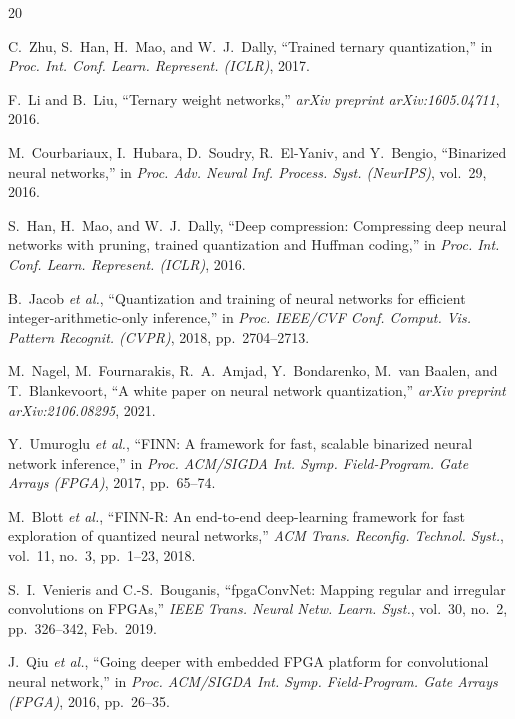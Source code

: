 \documentclass[conference]{IEEEtran}
\begin{document}
\begin{thebibliography}{20}

C.~Zhu, S.~Han, H.~Mao, and W.~J.~Dally, ``Trained ternary quantization,'' in \emph{Proc. Int. Conf. Learn. Represent. (ICLR)}, 2017.

F.~Li and B.~Liu, ``Ternary weight networks,'' \emph{arXiv preprint arXiv:1605.04711}, 2016.

M.~Courbariaux, I.~Hubara, D.~Soudry, R.~El-Yaniv, and Y.~Bengio, ``Binarized neural networks,'' in \emph{Proc. Adv. Neural Inf. Process. Syst. (NeurIPS)}, vol.~29, 2016.

S.~Han, H.~Mao, and W.~J.~Dally, ``Deep compression: Compressing deep neural networks with pruning, trained quantization and Huffman coding,'' in \emph{Proc. Int. Conf. Learn. Represent. (ICLR)}, 2016.

B.~Jacob \emph{et al.}, ``Quantization and training of neural networks for efficient integer-arithmetic-only inference,'' in \emph{Proc. IEEE/CVF Conf. Comput. Vis. Pattern Recognit. (CVPR)}, 2018, pp.~2704--2713.

M.~Nagel, M.~Fournarakis, R.~A.~Amjad, Y.~Bondarenko, M.~van Baalen, and T.~Blankevoort, ``A white paper on neural network quantization,'' \emph{arXiv preprint arXiv:2106.08295}, 2021.

Y.~Umuroglu \emph{et al.}, ``FINN: A framework for fast, scalable binarized neural network inference,'' in \emph{Proc. ACM/SIGDA Int. Symp. Field-Program. Gate Arrays (FPGA)}, 2017, pp.~65--74.

M.~Blott \emph{et al.}, ``FINN-R: An end-to-end deep-learning framework for fast exploration of quantized neural networks,'' \emph{ACM Trans. Reconfig. Technol. Syst.}, vol.~11, no.~3, pp.~1--23, 2018.

S.~I.~Venieris and C.-S.~Bouganis, ``fpgaConvNet: Mapping regular and irregular convolutions on FPGAs,'' \emph{IEEE Trans. Neural Netw. Learn. Syst.}, vol.~30, no.~2, pp.~326--342, Feb.~2019.

J.~Qiu \emph{et al.}, ``Going deeper with embedded FPGA platform for convolutional neural network,'' in \emph{Proc. ACM/SIGDA Int. Symp. Field-Program. Gate Arrays (FPGA)}, 2016, pp.~26--35.


\end{thebibliography}
\end{document}
